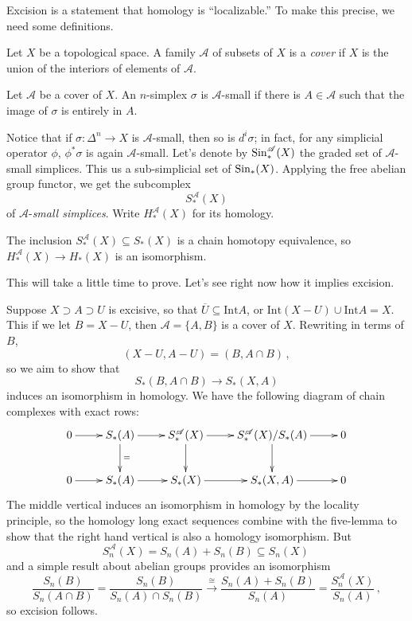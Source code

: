 \bigskip
Excision is a statement that homology is ``localizable.'' To make this precise, we need some definitions. 

\begin{definition}
Let $X$ be a topological space. A family $\mathscr{A}$ of subsets of $X$ is a
{\em cover} if $X$ is the union of the interiors of elements of $\mathscr{A}$. 
\end{definition}
\begin{definition}
Let ${\mathscr{A}}$ be a cover of $X$. An $n$-simplex $\sigma$ is ${\mathscr{A}}$-small if there is $A\in \mathscr{A}$ such that the image of $\sigma$ is entirely in $A$.
\end{definition}
Notice that if $\sigma:\Delta^n\to X$ is ${\mathscr{A}}$-small, then so is $d^i\sigma$; in fact, for any simplicial operator $\phi$, $\phi^*\sigma$ is again $\mathscr{A}$-small. Let's denote by $\mathrm{Sin}^{\mathscr{A}}_*(X)$ the graded set of ${\mathscr{A}}$-small simplices. This us a sub-simplicial set of $\mathrm{Sin}_*(X)$.
Applying the free abelian group functor, we get the subcomplex 
\[
S^{\mathscr{A}}_\ast(X)
\]
of $\mathscr{A}$-{\em small simplices}. Write $H^{\mathscr{A}}_*(X)$ for its
homology.
\begin{theorem}
The inclusion $S^\mathscr{A}_\ast(X)\subseteq S_\ast(X)$ is a chain homotopy equivalence, so $H^\mathscr{A}_\ast(X)\to H_\ast(X)$ is an isomorphism.
\end{theorem}
This will take a little time to prove. Let's see right now how it implies excision.

Suppose $X\supset A\supset U$ is excisive, so that 
$\overline U\subseteq\mathrm{Int}A$, or $\mathrm{Int}(X-U)\cup\mathrm{Int}A=X$.
This if we let $B=X-U$, then $\mathscr{A}=\{A,B\}$ is a cover of $X$. 
Rewriting in terms of $B$,
\[
(X-U,A-U)=(B,A\cap B)\,,
\]
so we aim to show that 
\[
S_*(B,A\cap B)\rightarrow S_*(X,A)
\]
induces an isomorphism in homology. We have the following diagram of chain complexes with exact rows:
\[
\xymatrix{
0 \ar[r] & S_*(A) \ar[d]^= \ar[r] & S^{\mathscr{A}}_*(X) \ar[d]\ar[r] &
S^{\mathscr{A}}_*(X)/S_*(A) \ar[d]\ar[r] & 0 \\
0 \ar[r] & S_*(A) \ar[r] & S_*(X) \ar[r] & S_*(X,A) \ar[r] & 0 
}\]
The middle vertical induces an isomorphism in homology by the locality principle, so the homology long exact sequences combine with the five-lemma to show that the right hand vertical is also a homology isomorphism. But 
\[
S^{\mathscr{A}}_n(X)=S_n(A)+S_n(B)\subseteq S_n(X)\,
\]
and a simple result about abelian groups provides an isomorphism
\[
\frac{S_n(B)}{S_n(A\cap B)}=
\frac{S_n(B)}{S_n(A)\cap S_n(B)}\xrightarrow{\cong}
\frac{S_n(A)+S_n(B)}{S_n(A)}
=\frac{S_n^{\mathscr{A}}(X)}{S_n(A)}\,,
\]
so excision follows.

